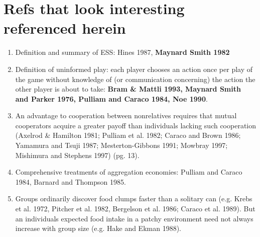 \documentclass[a4paper,11pt]{article}
\begin{document}
\section*{Refs that look interesting referenced herein}
\begin{enumerate}
\item Definition and summary of ESS: Hines 1987, {\bf Maynard Smith 1982}
\item Definition of uninformed play: each player chooses an action once per play of the game without knowledge of (or communication concerning) the action the other player is about to take: {\bf Bram \& Mattli 1993, Maynard Smith and Parker 1976, Pulliam and Caraco 1984, Noe 1990}. 
\item An advantage to cooperation between nonrelatives requires that mutual cooperators acquire a greater payoff than individuals lacking such cooperation (Axelrod \& Hamilton 1981; Pulliam et al. 1982; Caraco and Brown 1986; Yamamura and Tsuji 1987; Mesterton-Gibbons 1991; Mowbray 1997; Mishimura and Stephens 1997) (pg. 13). 
\item Comprehensive treatments of aggregation economies: Pulliam and Caraco 1984, Barnard and Thompson 1985. 
\item Groups ordinarily discover food clumps faster than a solitary can (e.g. Krebs et al. 1972, Pitcher et al. 1982, Bergelson et al. 1986; Caraco et al. 1989). But an individuals expected food intake in a patchy environment need not always increase with group size (e.g. Hake and Ekman 1988). 
\end{enumerate}




\end{document}
